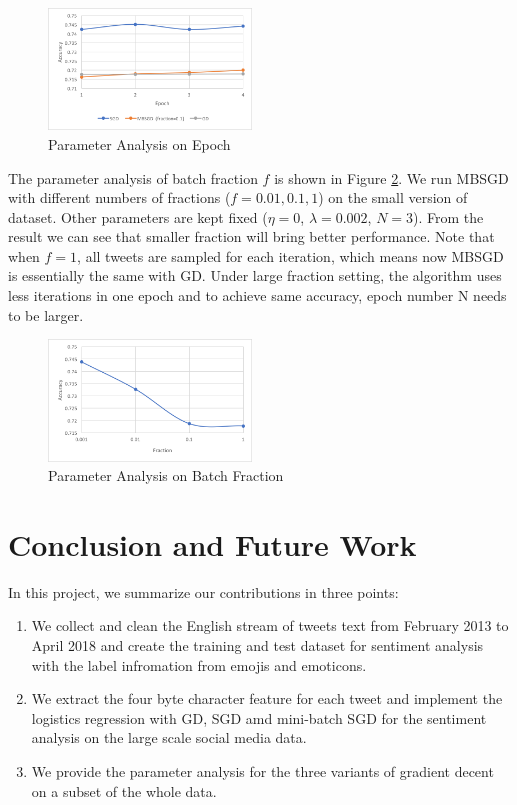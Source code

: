\documentclass[sigconf]{acmart}
\begin{document}
\begin{figure}[ht]
\centering
\includegraphics[width=0.48\textwidth]{epoch.png}
\caption{Parameter Analysis on Epoch}
\label{epoch}
\end{figure}

The parameter analysis of batch fraction $f$ is shown in Figure \ref{frac}. We run MBSGD with different numbers of fractions ($f = 0.01, 0.1, 1$) on the small version of dataset. Other parameters are kept fixed ($\eta = 0$, $\lambda = 0.002$, $N = 3$). From the result we can see that smaller fraction will bring better performance. Note that when $f = 1$, all tweets are sampled for each iteration, which means now MBSGD is essentially the same with GD. Under large fraction setting, the algorithm uses less iterations in one epoch and to achieve same accuracy, epoch number N needs to be larger. 

\begin{figure}[ht]
\centering
\includegraphics[width=0.48\textwidth]{fraction.png}
\caption{Parameter Analysis on Batch Fraction}
\label{frac}
\end{figure}



\section{Conclusion and Future Work}
\label{sec:conclusionAndFutureWork}

In this project, we summarize our contributions in three points:

\begin{enumerate}  
\item We collect and clean the English stream of tweets text from February 2013 to April 2018 and create the training and test dataset for sentiment analysis with the label infromation from emojis and emoticons.
\item We extract the four byte character feature for each tweet and implement the logistics regression with GD, SGD amd mini-batch SGD for the sentiment analysis on the large scale social media data.
\item We provide the parameter analysis for the three variants of gradient decent on a subset of the whole data.
\end{enumerate}
\end{document}
